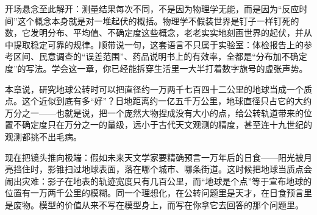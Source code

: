 开场悬念至此解开：测量结果每次不同，不是因为物理学无能，而是因为“反应时间”这个概念本身就是对一堆起伏的概括。物理学不假装世界是钉子一样钉死的数，它发明分布、平均值、不确定度这些概念，老老实实地刻画世界的起伏，并从中提取稳定可靠的规律。顺带说一句，这套语言不只属于实验室：体检报告上的参考区间、民意调查的“误差范围”、药品说明书上的有效率，全都是“分布加不确定度”的写法。学会这一章，你已经能拆穿生活里一大半打着数字旗号的虚张声势。


\begin{thought}[把地球装进一个点]
本章说，研究地球公转时可以把直径约一万两千七百四十二公里的地球当成一个质点。这个近似到底有多“好”？日地距离约一亿五千万公里，地球直径只占它的大约万分之一——也就是说，把一个庞然大物捏成没有大小的点，给公转轨道带来的位置不确定度只在万分之一的量级，远小于古代天文观测的精度，甚至连十九世纪的观测都挑不出毛病。

\begin{center}
\end{center}

现在把镜头推向极端：假如未来天文学家要精确预言一万年后的日食——阳光被月亮挡住时，影锥扫过地球表面，落在哪个城市、哪条街道。这时候把地球当质点会闹出灾难：影子在地表的轨迹宽度只有几百公里，而“地球是个点”等于宣布地球的位置有一万两千公里的模糊。同一个理想化，在公转问题里是天才，在日食预言里是废物。模型的价值从来不写在模型身上，而写在你拿它去回答的那个问题里。
\end{thought}

